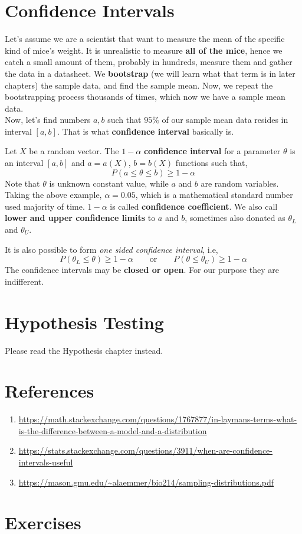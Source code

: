 \section{Confidence Intervals}
Let's assume we are a scientist that want to measure the mean of the specific kind of mice's weight.
It is unrealistic to measure \textbf{all of the mice}, hence we catch a small amount of them, probably in hundreds, measure them and gather the data in a datasheet. We \textbf{bootstrap} (we will learn what that term is in later chapters) the sample data, and find the sample mean. Now, we repeat the bootstrapping process thousands of times, which now we have a sample mean data.
\\
Now, let's find numbers $a,b$ such that $95\%$ of our sample mean data resides in interval $[a,b]$. That is what \textbf{confidence interval} basically is.
\begin{definition}
    Let $X$ be a random vector. The $1 - \alpha$ \textbf{confidence interval} for a parameter $\theta$ is an interval $[a,b]$ and $a = a(X)$, $b = b(X)$ functions such that,
    \[ P(a \le \theta \le b) \ge  1 - \alpha \]
    Note that $\theta$ is unknown constant value, while  $a$ and $b$ are random variables. 
   \\
   Taking the above example, $\alpha = 0.05$, which is a mathematical standard number used majority of time. $1 - \alpha$ is called \textbf{confidence coefficient}. We also call \textbf{lower and upper confidence limits} to $a$ and $b$, sometimes also donated as $\theta_{L}$ and $\theta_{U}$.
\end{definition}
It is also possible to form \textit{one sided confidence interval}, i.e,
\[ P( \theta_{L} \le \theta ) \ge 1 - \alpha  \qquad \text{or} \qquad P( \theta \le \theta_{U}) \ge 1 - \alpha\]
The confidence intervals may be \textbf{closed or open}. For our purpose they are indifferent. 


\section{Hypothesis Testing}
Please read the Hypothesis chapter instead. \\

\section{References}
\begin{enumerate}
    \item  \url{https://math.stackexchange.com/questions/1767877/in-laymans-terms-what-is-the-difference-between-a-model-and-a-distribution}
    \item \url{https://stats.stackexchange.com/questions/3911/when-are-confidence-intervals-useful}
    \item \url{https://mason.gmu.edu/~alaemmer/bio214/sampling-distributions.pdf}
    \end{enumerate} 
\section{Exercises}

